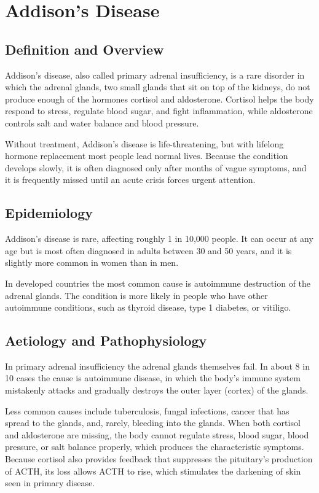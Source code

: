 \chapter{Addison's Disease}

\section*{Definition and Overview}
Addison's disease, also called primary adrenal insufficiency, is a rare disorder in which the adrenal glands, two small glands that sit on top of the kidneys, do not produce enough of the hormones cortisol and aldosterone. Cortisol helps the body respond to stress, regulate blood sugar, and fight inflammation, while aldosterone controls salt and water balance and blood pressure.

Without treatment, Addison's disease is life-threatening, but with lifelong hormone replacement most people lead normal lives. Because the condition develops slowly, it is often diagnosed only after months of vague symptoms, and it is frequently missed until an acute crisis forces urgent attention.

\section*{Epidemiology}
Addison's disease is rare, affecting roughly 1 in 10,000 people. It can occur at any age but is most often diagnosed in adults between 30 and 50 years, and it is slightly more common in women than in men.

In developed countries the most common cause is autoimmune destruction of the adrenal glands. The condition is more likely in people who have other autoimmune conditions, such as thyroid disease, type 1 diabetes, or vitiligo.

\section*{Aetiology and Pathophysiology}
In primary adrenal insufficiency the adrenal glands themselves fail. In about 8 in 10 cases the cause is autoimmune disease, in which the body's immune system mistakenly attacks and gradually destroys the outer layer (cortex) of the glands.

Less common causes include tuberculosis, fungal infections, cancer that has spread to the glands, and, rarely, bleeding into the glands. When both cortisol and aldosterone are missing, the body cannot regulate stress, blood sugar, blood pressure, or salt balance properly, which produces the characteristic symptoms. Because cortisol also provides feedback that suppresses the pituitary's production of ACTH, its loss allows ACTH to rise, which stimulates the darkening of skin seen in primary disease.

